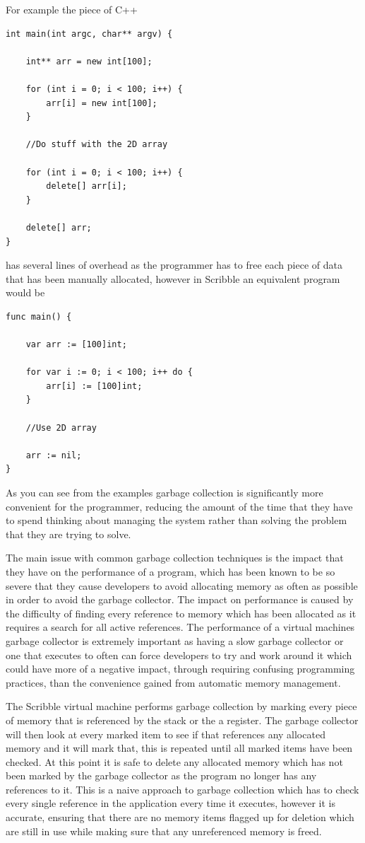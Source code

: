 \documentclass[]{final_report}
\begin{document}
For example the piece of C++
\begin{verbatim}
int main(int argc, char** argv) {

	int** arr = new int[100];
	
	for (int i = 0; i < 100; i++) {
		arr[i] = new int[100];		
	}
	
	//Do stuff with the 2D array
	
	for (int i = 0; i < 100; i++) {
		delete[] arr[i];
	}
	
	delete[] arr;
}
\end{verbatim}
has several lines of overhead as the programmer has to free each piece of data that has been manually allocated, however in Scribble an equivalent program would be
\begin{verbatim}
func main() {

	var arr := [100]int;
	
	for var i := 0; i < 100; i++ do {
		arr[i] := [100]int;
	}
	
	//Use 2D array
	
	arr := nil;
}
\end{verbatim}
As you can see from the examples garbage collection is significantly more convenient for the programmer, reducing the amount of the time that they have to spend thinking about managing the system rather than solving the problem that they are trying to solve.

The main issue with common garbage collection techniques is the impact that they have on the performance of a program, which has been known to be so severe that they cause developers to avoid allocating memory as often as possible in order to avoid the garbage collector. The impact on performance is caused by the difficulty of finding every reference to memory which has been allocated as it requires a search for all active references. The performance of a virtual machines garbage collector is extremely important as having a slow garbage collector or one that executes to often can force developers to try and work around it which could have more of a negative impact, through requiring confusing programming practices, than the convenience gained from automatic memory management.

The Scribble virtual machine performs garbage collection by marking every piece of memory that is referenced by the stack or the a register. The garbage collector will then look at every marked item to see if that references any allocated memory and it will mark that, this is repeated until all marked items have been checked. At this point it is safe to delete any allocated memory which has not been marked by the garbage collector as the program no longer has any references to it. This is a naive approach to garbage collection which has to check every single reference in the application every time it executes, however it is accurate, ensuring that there are no memory items flagged up for deletion which are still in use while making sure that any unreferenced memory is freed.
\end{document}
